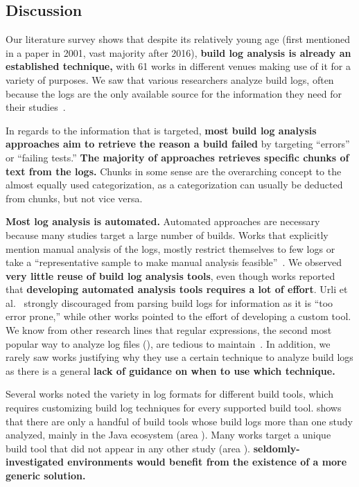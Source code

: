 \subsection{Discussion}
\label{sec:lit-sur:discussion}

Our literature survey shows that despite its relatively young age
(first mentioned in a paper in 2001, vast majority after
2016), \textbf{build log analysis is already an established technique,} with 61 works in different venues making use of it for a variety of purposes.
We saw that various researchers analyze build logs, often because the
logs are the only available source for the
information they need for their studies~\cite{ren2018automated,
seo2014programmers,beller2017oops,zampetti2017open,rausch2017empirical}.

In regards to the information that is targeted, \textbf{most build log
analysis approaches aim to retrieve the reason a build failed} by
targeting ``errors'' or ``failing tests.''
\textbf{The majority of approaches retrieves specific chunks of
text from the logs.} Chunks in some sense are the overarching concept to the almost equally used categorization, as a categorization can usually be deducted from chunks, but not vice versa.

\textbf{Most log analysis is automated.} Automated approaches are
necessary because many studies target a large number of builds.
Works
that explicitly mention manual analysis of the logs, mostly
restrict themselves to few logs or take a ``representative sample to
make manual analysis feasible''~\cite{zolfagharinia2017not}.
We observed \textbf{very little reuse of build log analysis tools},
even though works reported that
\textbf{developing automated analysis tools requires a lot of effort}.
Urli et al.~\cite{urli2018design} strongly discouraged from parsing
build logs for information as it is ``too error prone,'' while other
works pointed to the effort of developing a custom tool.
We know from other research lines that regular expressions, the second most popular way to analyze log files (), are tedious to
maintain~\cite{michael2019regexes}.
In addition, we rarely saw works justifying why they use a certain
technique to analyze build logs as there is a general \textbf{lack of
guidance on when to use which technique.}

Several works noted the variety in log formats for different build
tools, which requires customizing build log techniques for
every supported build tool.
 shows that there are only a handful of build tools whose build logs more than one study analyzed, mainly in the Java ecosystem (area ). Many works target a unique build tool that did not appear in any other study (area ). 
\textbf{seldomly-investigated
environments would benefit from the
existence of a more generic solution.}

